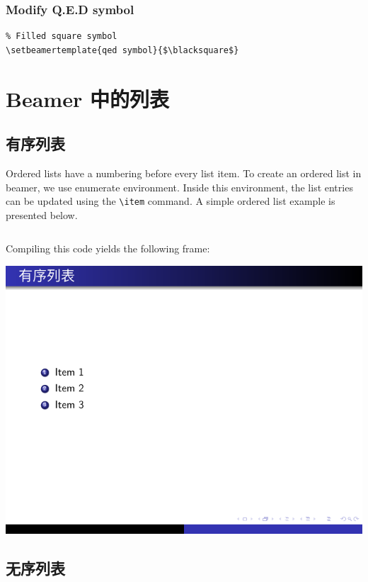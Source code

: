 \subsubsection{Modify Q.E.D symbol}
\begin{verbatim}
% Filled square symbol
\setbeamertemplate{qed symbol}{$\blacksquare$}
\end{verbatim}

\section{Beamer 中的列表}

\subsection{有序列表}

Ordered lists have a numbering before every list item. To create an ordered list in beamer, we use enumerate environment. Inside this environment, the list entries can be updated using the \verb|\item| command. A simple ordered list example is presented below.

\inputminted[linenos=true]{latex}{examples/beamer/beamerlist01.tex}

Compiling this code yields the following frame:

\includegraphics{examples/beamer/beamerlist01.pdf}

\subsection{无序列表}

